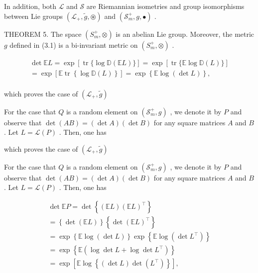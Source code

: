 \documentclass[11pt]{article}
\begin{document}
In addition, both  $\mathcal{L}$  and  $\mathcal{S}$  are Riemannian isometries and group isomorphisms between Lie groups  $(\mathcal{L}_{+},\tilde{g},\circledast)$  and  $(\mathcal{S}_m^+,g,\bullet)$ .

THEOREM 5. The space  $(S_m^+, \otimes)$  is an abelian Lie group. Moreover, the metric  $g$  defined in (3.1) is a bi-invariant metric on  $(S_m^+, \otimes)$ .

$$
\begin{array}{l} \det  \mathbb {E} L = \exp [ \operatorname {t r} \{\log \mathbb {D} (\mathbb {E} L) \} ] = \exp [ \operatorname {t r} \{\mathbb {E} \log \mathbb {D} (L) \} ] \\ = \exp \left[ \mathbb {E} \operatorname {t r} \left\{\log \mathbb {D} (L) \right\} \right] = \exp \left\{\mathbb {E} \log (\det  L) \right\}, \\ \end{array}
$$

which proves the case of  $(\mathcal{L}_{+},\tilde{g})$

For the case that  $Q$  is a random element on  $(\mathcal{S}_m^+, g)$ , we denote it by  $P$  and observe that  $\operatorname{det}(AB) = (\operatorname{det} A)(\operatorname{det} B)$  for any square matrices  $A$  and  $B$ . Let  $L = \mathcal{L}(P)$ . Then, one has

which proves the case of  $(\mathcal{L}_{+},\tilde{g})$

For the case that  $Q$  is a random element on  $(\mathcal{S}_m^+, g)$ , we denote it by  $P$  and observe that  $\operatorname{det}(AB) = (\operatorname{det} A)(\operatorname{det} B)$  for any square matrices  $A$  and  $B$ . Let  $L = \mathcal{L}(P)$ . Then, one has

$$
\begin{array}{l} \det  \mathbb {E} P = \det  \left\{\left(\mathbb {E} L\right) \left(\mathbb {E} L\right) ^ {\top} \right\} \\ = \left\{\det  (\mathbb {E} L) \right\} \left\{\det  (\mathbb {E} L) ^ {\top} \right\} \\ = \exp \left\{\mathbb {E} \log (\det  L) \right\} \exp \left\{\mathbb {E} \log (\det  L ^ {\top}) \right\} \\ = \exp \left\{\mathbb {E} \left(\log \det  L + \log \det  L ^ {\top}\right) \right\} \\ = \exp \left[ \mathbb {E} \log \left\{\left(\det  L\right) \det  \left(L ^ {\top}\right) \right\} \right], \\ \end{array}
$$
\end{document}
